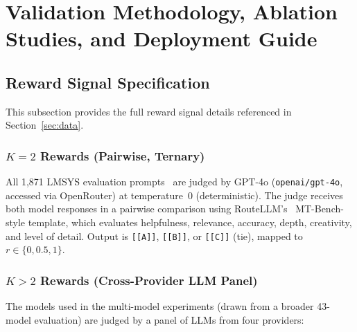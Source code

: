 
\section{Validation Methodology, Ablation Studies, and Deployment Guide}
\label{app:validation_ablation}


\subsection{Reward Signal Specification}
\label{app:reward_signal}

This subsection provides the full reward signal details referenced in Section~\ref{sec:data}.

\subsubsection{$K{=}2$ Rewards (Pairwise, Ternary)}

All 1,871 LMSYS evaluation prompts~\cite{zheng2023judging} are judged by GPT-4o (\texttt{openai/gpt-4o}, accessed via OpenRouter) at temperature~0 (deterministic).
The judge receives both model responses in a pairwise comparison using RouteLLM's~\cite{ong2024routellm} MT-Bench-style template, which evaluates helpfulness, relevance, accuracy, depth, creativity, and level of detail.
Output is \texttt{[[A]]}, \texttt{[[B]]}, or \texttt{[[C]]} (tie), mapped to $r \in \{0, 0.5, 1\}$.


\subsubsection{$K{>}2$ Rewards (Cross-Provider LLM Panel)}
\label{app:cot_panel}

The models used in the multi-model experiments (drawn from a broader 43-model evaluation) are judged by a panel of LLMs from four providers:

